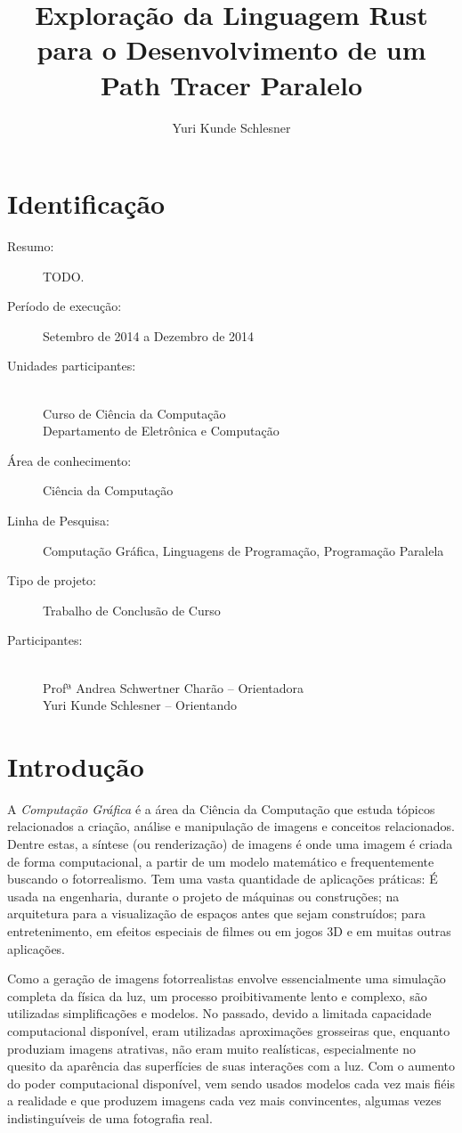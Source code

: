 \documentclass[12pt]{article}
\title{Exploração da Linguagem Rust para o Desenvolvimento de um Path Tracer Paralelo}
\author{Yuri Kunde Schlesner}
\newcommand{\todo}[1]{\textsf{\color{red}#1}}
\begin{document}
\maketitle

\section{Identificação}

\begin{description}
	\item[Resumo:] \todo{TODO.}
	\item[Período de execução:] Setembro de 2014 a Dezembro de 2014
	\item[Unidades participantes:] ~\\ Curso de Ciência da Computação \\ Departamento de Eletrônica e Computação
	\item[Área de conhecimento:] Ciência da Computação
	\item[Linha de Pesquisa:] Computação Gráfica, Linguagens de Programação, Programação Paralela
	\item[Tipo de projeto:] Trabalho de Conclusão de Curso
	\item[Participantes:] ~\\ Profª Andrea Schwertner Charão -- Orientadora \\ Yuri Kunde Schlesner -- Orientando
\end{description}

\section{Introdução}

A \emph{Computação Gráfica} é a área da Ciência da Computação que estuda tópicos relacionados a
criação, análise e manipulação de imagens e conceitos relacionados. Dentre estas, a síntese (ou
renderização) de imagens é onde uma imagem é criada de forma computacional, a partir de um modelo
matemático e frequentemente buscando o fotorrealismo. Tem uma vasta quantidade de aplicações
práticas: É usada na engenharia, durante o projeto de máquinas ou construções; na arquitetura para a
visualização de espaços antes que sejam construídos; para entretenimento, em efeitos especiais de
filmes ou em jogos 3D e em muitas outras aplicações.

Como a geração de imagens fotorrealistas envolve essencialmente uma simulação completa da física da
luz, um processo proibitivamente lento e complexo, são utilizadas simplificações e modelos. No
passado, devido a limitada capacidade computacional disponível, eram utilizadas aproximações
grosseiras que, enquanto produziam imagens atrativas, não eram muito realísticas, especialmente no
quesito da aparência das superfícies de suas interações com a luz. Com o aumento do poder
computacional disponível, vem sendo usados modelos cada vez mais fiéis a realidade e que produzem
imagens cada vez mais convincentes, algumas vezes indistinguíveis de uma fotografia real.
\end{document}
